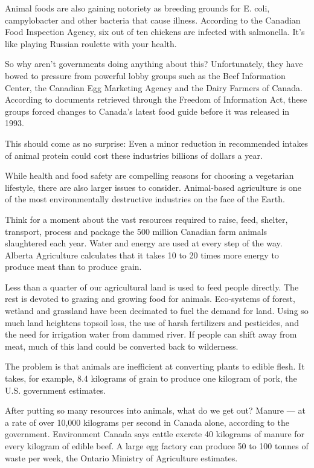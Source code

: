 \documentclass[a4paper]{article}
\begin{document}
Animal foods are also gaining notoriety as breeding grounds for E. coli, campylobacter and other bacteria that cause illness. According to the Canadian Food Inspection Agency, six out of ten chickens are infected with salmonella. It's like playing Russian roulette with your health.

So why aren't governments doing anything about this? Unfortunately, they have bowed to pressure from powerful lobby groups such as the Beef Information Center, the Canadian Egg Marketing Agency and the Dairy Farmers of Canada. According to documents retrieved through the Freedom of Information Act, these groups forced changes to Canada's latest food guide before it was released in 1993.

This should come as no surprise: Even a minor reduction in recommended intakes of animal protein could cost these industries billions of dollars a year.

While health and food safety are compelling reasons for choosing a vegetarian lifestyle, there are also larger issues to consider. Animal-based agriculture is one of the most environmentally destructive industries on the face of the Earth.

Think for a moment about the vast resources required to raise, feed, shelter, transport, process and package the 500 million Canadian farm animals slaughtered each year. Water and energy are used at every step of the way. Alberta Agriculture calculates that it takes 10 to 20 times more energy to produce meat than to produce grain.

Less than a quarter of our agricultural land is used to feed people directly. The rest is devoted to grazing and growing food for animals. Eco-systems of forest, wetland and grassland have been decimated to fuel the demand for land. Using so much land heightens topsoil loss, the use of harsh fertilizers and pesticides, and the need for irrigation water from dammed river. If people can shift away from meat, much of this land could be converted back to wilderness.

The problem is that animals are inefficient at converting plants to edible flesh. It takes, for example, 8.4 kilograms of grain to produce one  kilogram of pork, the U.S. government estimates.

After putting so many resources into animals, what do we get out? Manure --- at a rate of over 10,000 kilograms per second in Canada alone, according to the government. Environment Canada says cattle excrete 40 kilograms of manure for every kilogram of edible beef. A large egg factory can produce 50 to 100 tonnes of waste per week, the Ontario Ministry of Agriculture estimates.
\end{document}
